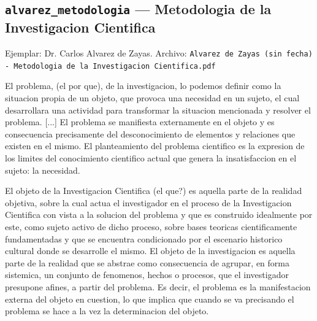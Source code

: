 \documentclass[11pt,a4paper]{article}
\newcommand{\campo}[1]{\textcolor{gris}{\footnotesize #1}}
\begin{document}
\subsection{\texttt{alvarez\_metodologia} --- Metodologia de la Investigacion Cientifica}
{\footnotesize\campo{Ejemplar:} Dr. Carlos Alvarez de Zayas. \campo{Archivo:} \texttt{Alvarez de Zayas (sin fecha) - Metodologia de la Investigacion Cientifica.pdf}\par}\vspace{4pt}
\vspace{3pt}\noindent{\small\textbf{p.\ 7} \quad \campo{La insuficiencia de una herramienta con esos atributos es la CONTRADICCION que origina el trabajo. (tesis/capitulos/01\_introduccion.tex:15, cita sin localizador)}}\par
\begin{pasaje}\footnotesize El problema, (el por que), de la investigacion, lo podemos definir como la situacion propia de un objeto, que provoca una necesidad en un sujeto, el cual desarrollara una actividad para transformar la situacion mencionada y resolver el problema. [...] El problema se manifiesta externamente en el objeto y es consecuencia precisamente del desconocimiento de elementos y relaciones que existen en el mismo. El planteamiento del problema cientifico es la expresion de los limites del conocimiento cientifico actual que genera la insatisfaccion en el sujeto: la necesidad.\end{pasaje}
\vspace{3pt}\noindent{\small\textbf{p.\ 8} \quad \campo{Uso de la categoria OBJETO DE ESTUDIO como parte de la realidad sobre la que actua el investigador para resolver el problema. (tesis/capitulos/01\_introduccion.tex:17, cita sin localizador)}}\par
\begin{pasaje}\footnotesize El objeto de la Investigacion Cientifica (el que?) es aquella parte de la realidad objetiva, sobre la cual actua el investigador en el proceso de la Investigacion Cientifica con vista a la solucion del problema y que es construido idealmente por este, como sujeto activo de dicho proceso, sobre bases teoricas cientificamente fundamentadas y que se encuentra condicionado por el escenario historico cultural donde se desarrolle el mismo. El objeto de la investigacion es aquella parte de la realidad que se abstrae como consecuencia de agrupar, en forma sistemica, un conjunto de fenomenos, hechos o procesos, que el investigador presupone afines, a partir del problema. Es decir, el problema es la manifestacion externa del objeto en cuestion, lo que implica que cuando se va precisando el problema se hace a la vez la determinacion del objeto.\end{pasaje}
\end{document}
